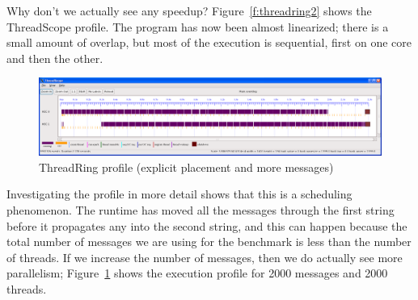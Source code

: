 Why don't we actually see any speedup?
Figure~\ref{f:threadring2} shows the ThreadScope profile.
The program has now been almost linearized; there is a small amount of
overlap, but most of the execution is sequential, first on one core
and then the other.

\begin{figure}
\begin{center}
\includegraphics[scale=0.3]{threadring3.png}
\end{center}
\caption{ThreadRing profile (explicit placement and more messages)}
\label{f:threadring3}
\end{figure}

Investigating the profile in more detail shows that this is a
scheduling phenomenon.  The runtime has moved all the messages through
the first string before it propagates any into the second string, and
this can happen because the total number of messages we are using for
the benchmark is less than the number of threads.  If we increase the
number of messages, then we do actually see more parallelism;
Figure~\ref{f:threadring3} shows the execution profile for 2000
messages and 2000 threads.
